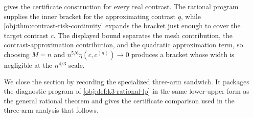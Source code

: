 gives the certificate construction for every real contrast. The rational program supplies the inner bracket for the approximating contrast \(q\), while \cref{obj:thm:contrast-risk-continuity} expands the bracket just enough to cover the target contrast \(c\). The displayed bound separates the mesh contribution, the contrast-approximation contribution, and the quadratic approximation term, so choosing \(M=n\) and \(n^{5/6}\eta(c,c^{(n)})\to0\) produces a bracket whose width is negligible at the \(n^{4/3}\) scale.

We close the section by recording the specialized three-arm sandwich. It packages the diagnostic program of \cref{obj:def:k3-rational-lp} in the same lower-upper form as the general rational theorem and gives the certificate comparison used in the three-arm analysis that follows.

